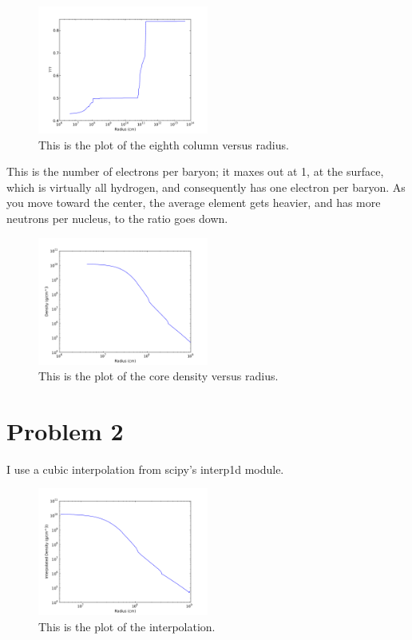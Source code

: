 \documentclass[11pt,letterpaper]{article}
\begin{document}
\begin{figure}[bth]
\centering
\includegraphics[width=0.5\textwidth]{EighthColumn}
\caption{This is the plot of the eighth column versus radius.}
\label{fig:simpleplot}
\end{figure}

This is the number of electrons per baryon; it maxes out at 1, at the surface, which is virtually all hydrogen, and consequently has one electron per baryon. As you move toward the center, the average element gets heavier, and has more neutrons per nucleus, to the ratio goes down.

\begin{figure}[bth]
\centering
\includegraphics[width=0.5\textwidth]{Density-Radius}
\caption{This is the plot of the core density versus radius.}
\label{fig:simpleplot}
\end{figure}

\section*{Problem 2}

I use a cubic interpolation from scipy's interp1d module.

\begin{figure}[bth]
\centering
\includegraphics[width=0.5\textwidth]{Interpolation}
\caption{This is the plot of the interpolation.}
\label{fig:simpleplot}
\end{figure}
\end{document}
